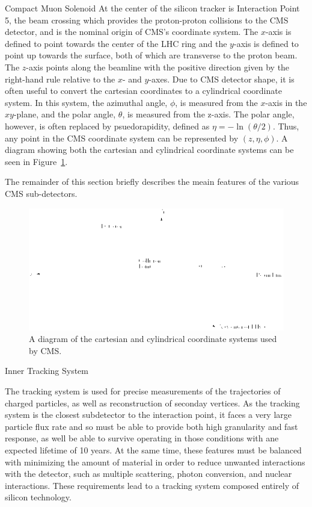 \begin{section}{Compact Muon Solenoid}
At the center of the silicon tracker is Interaction Point 5, the beam crossing which provides the proton-proton collisions to the CMS detector, and is the nominal origin of CMS's coordinate system.
The $x$-axis is defined to point towards the center of the LHC ring and the $y$-axis is defined to point up towards the surface, both of which are transverse to the proton beam. 
The $z$-axis points along the beamline with the positive direction given by the right-hand rule relative to the $x$- and $y$-axes.
Due to CMS detector shape, it is often useful to convert the cartesian coordinates to a cylindrical coordinate system.
In this system, the azimuthal angle, $\phi$, is measured from the $x$-axis in the $xy$-plane, and the polar angle, $\theta$, is measured from the z-axis.
The polar angle, however, is often replaced by psuedorapidity, defined as $\eta = -\ln(\theta/2)$.
Thus, any point in the CMS coordinate system can be represented by $(z, \eta, \phi)$.
A diagram showing both the cartesian and cylindrical coordinate systems can be seen in Figure~\ref{fig:cms_coordinate_system}.

The remainder of this section briefly describes the meain features of the various CMS sub-detectors.

\begin{figure}[tbp!]
\begin{center}
\includegraphics[angle=0,width=0.80\columnwidth]{fig/cms_coordinate_system.png}
\end{center}
\caption{A diagram of the cartesian and cylindrical coordinate systems used by CMS.~\cite{Schott:1699952}}
\label{fig:cms_coordinate_system}
\end{figure}

\begin{subsection}{Inner Tracking System}

The tracking system is used for precise measurements of the trajectories of charged particles, as well as reconstruction of seconday vertices.
As the tracking system is the closest subdetector to the interaction point, it faces a very large particle flux rate and so must be able to provide both high granularity and fast response, as well be able to survive operating in those conditions with ane expected lifetime of 10 years.
At the same time, these features must be balanced with minimizing the amount of material in order to reduce unwanted interactions with the detector, such as multiple scattering, photon conversion, and nuclear interactions.
These requirements lead to a tracking system composed entirely of silicon technology.


\end{subsection}
\end{section}
